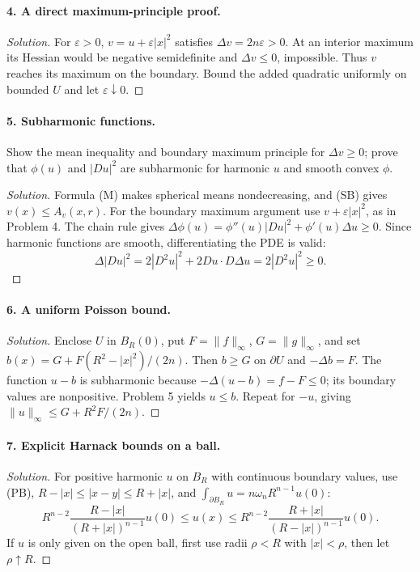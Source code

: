 \paragraph{4. A direct maximum-principle proof.}
\begin{proof}[Solution]
For $\varepsilon>0$, $v=u+\varepsilon|x|^2$ satisfies
$\Delta v=2n\varepsilon>0$. At an interior maximum its Hessian would
be negative semidefinite and $\Delta v\leq0$, impossible.
Thus $v$ reaches its maximum on the boundary.
Bound the added quadratic uniformly on bounded $U$ and let
$\varepsilon\downarrow0$.
\end{proof}

\paragraph{5. Subharmonic functions.}
Show the mean inequality and boundary maximum principle for $\Delta v\geq0$;
prove that $\phi(u)$ and $|Du|^2$ are subharmonic for harmonic $u$
and smooth convex $\phi$.
\begin{proof}[Solution]
Formula (M) makes spherical means nondecreasing, and (SB) gives
$v(x)\leq A_v(x,r)$.
For the boundary maximum argument use
$v+\varepsilon|x|^2$, as in Problem 4.
The chain rule gives
$\Delta\phi(u)=\phi''(u)|Du|^2+\phi'(u)\Delta u\geq0$.
Since harmonic functions are smooth, differentiating the PDE is valid:
\[
 \Delta|Du|^2=2|D^2u|^2+2Du\cdot D\Delta u=2|D^2u|^2\geq0.
\]
\end{proof}
\Needspace{45mm}

\paragraph{6. A uniform Poisson bound.}
\begin{proof}[Solution]
Enclose $U$ in $B_R(0)$, put $F=\|f\|_\infty$, $G=\|g\|_\infty$, and set
$b(x)=G+F(R^2-|x|^2)/(2n)$.
Then $b\geq G$ on $\partial U$ and $-\Delta b=F$.
The function $u-b$ is subharmonic because $-\Delta(u-b)=f-F\leq0$;
its boundary values are nonpositive. Problem 5 yields $u\leq b$.
Repeat for $-u$, giving
$\|u\|_\infty\leq G+R^2F/(2n)$.
\end{proof}

\paragraph{7. Explicit Harnack bounds on a ball.}
\begin{proof}[Solution]
For positive harmonic $u$ on $B_R$ with continuous boundary values,
use (PB), $R-|x|\leq|x-y|\leq R+|x|$, and
$\int_{\partial B_R}u=n\omega_nR^{n-1}u(0)$:
\[
 R^{n-2}\frac{R-|x|}{(R+|x|)^{n-1}}u(0)
 \leq u(x)\leq
 R^{n-2}\frac{R+|x|}{(R-|x|)^{n-1}}u(0).
\]
If $u$ is only given on the open ball, first use radii $\rho<R$
with $|x|<\rho$, then let $\rho\uparrow R$.
\end{proof}

